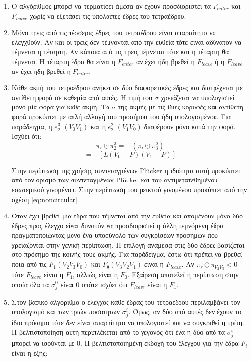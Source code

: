\begin{enumerate}
\item Ο αλγόριθμος μπορεί να τερματίσει άμεσα αν έχουν προσδιοριστεί τα $F_{enter}$ και $F_{leave}$ χωρίς να εξετάσει τις υπόλοιπες έδρες του τετραέδρου.
\item Μόνο τρεις από τις τέσσερις έδρες του τετραέδρου είναι απαραίτητο να ελεγχθούν. Αν και οι τρεις δεν τέμνονται από την ευθεία τότε είναι αδύνατον να τέμνεται η τέταρτη. Αν κάποια από τις τρεις τέμνεται τότε και η τέταρτη θα τέμνεται. Η τέταρτη έδρα θα είναι η $F_{enter}$ αν έχει ήδη βρεθεί η $F_{leave}$ ή η $F_{leave}$ αν έχει ήδη βρεθεί η $F_{enter}$. 
\item Κάθε ακμή του τετραέδρου ανήκει σε δύο διαφορετικές έδρες και διατρέχεται με αντίθετη φορά σε καθεμία από αυτές. Η τιμή του $\sigma$ χρειάζεται να υπολογιστεί μόνο μία φορά για κάθε ακμή. Το $\sigma$ της ακμής με τις ίδιες κορυφές και αντίθετη φορά προκύπτει με απλή αλλαγή του προσήμου του ήδη υπολογισμένου. Για παράδειγμα, η $e^3_2$ $(V_{0}V_{1})$ και η $e^2_2$ $(V_{1}V_{0})$ διαφέρουν μόνο κατά την φορά. Ισχύει ότι:
\begin{equation*}
\pi_r \odot \pi^3_2 = -(\pi_r \odot \pi^2_3)
\end{equation*}
\begin{equation*}
[L (V_1-P) (V_0-P)] = - [L (V_0-P) (V_1-P)]
\end{equation*}

Στην περίπτωση της χρήσης συντεταγμένων Plücker η ιδιότητα αυτή προκύπτει από τον ορισμό των συντεταγμένων Plücker και του αντιμετατεθημένου εσωτερικού γινομένου. Στην περίπτωση του μεικτού γινομένου προκύπτει από την σχέση \ref{eq:noncircular}.
\item Όταν έχει βρεθεί μία έδρα που τέμνεται από την ευθεία και απομένουν μόνο δύο έδρες προς έλεγχο είναι δυνατόν να προσδιοριστεί η άλλη τεμνόμενη έδρα πραγματοποιώντας μόνο ένα υποσύνολο των συγκρίσεων προσήμων που χρειάζονται στην γενική περίπτωση. Η επιλογή ανάμεσα στις δύο έδρες βασίζεται στο πρόσημο της κοινής τους ακμής. Για παράδειγμα, έστω ότι πρέπει να βρεθεί ποια από τις $F_1(V_2V_3V_0)$ και $F_0(V_3V_2V_1)$ είναι η $F_{leave}$. Αν $\pi_r \odot \pi_{V_2V_3} < 0$ τότε $F_{leave}$ είναι η $F_1$, αλλιώς είναι η $F_0$. Εξαίρεση αποτελεί η περίπτωση στην οποία όλα τα $\sigma^0_j$ είναι 0 οπότε ισχύει ότι $F_{leave}$ είναι η $F_1$. 
\item Στον βασικό αλγόριθμο ο έλεγχος κάθε έδρας του τετραέδρου περιλαμβάνει τον υπολογισμό και των τριών ποσοτήτων $\sigma^i_j$. Όμως, αν δύο από αυτές δεν έχουν το ίδιο πρόσημο τότε δεν είναι απαραίτητο να υπολογιστεί και να συγκριθεί η τρίτη. Η βελτιστοποίηση αυτή περιπλέκεται από το γεγονός ότι ένα ή δύο από τα $\sigma^i_j$ μπορεί να ισούνται με 0. Η βελτιστοποιημένη εκδοχή του έλεγχου για την έδρα $F_i$ είναι η εξής:


\end{enumerate}
